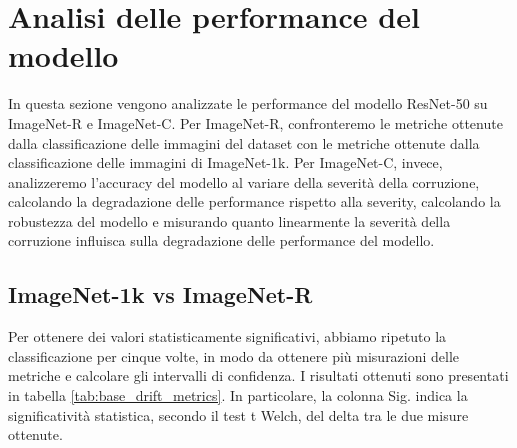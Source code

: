 \section{Analisi delle performance del modello}
In questa sezione vengono analizzate le performance del modello ResNet-50 su ImageNet-R e ImageNet-C. Per ImageNet-R, confronteremo le metriche ottenute dalla classificazione delle immagini del dataset con le metriche ottenute dalla classificazione delle immagini di ImageNet-1k. Per ImageNet-C, invece, analizzeremo l'accuracy del modello al variare della severità della corruzione, calcolando la degradazione delle performance rispetto alla severity, calcolando la robustezza del modello e misurando quanto linearmente la severità della corruzione influisca sulla degradazione delle performance del modello.
\subsection{ImageNet-1k vs ImageNet-R}
Per ottenere dei valori statisticamente significativi, abbiamo ripetuto la classificazione per cinque volte, in modo da ottenere più misurazioni delle metriche e calcolare gli intervalli di confidenza. I risultati ottenuti sono presentati in tabella \ref{tab:base_drift_metrics}. In particolare, la colonna Sig. indica la significatività statistica, secondo il test t Welch, del delta tra le due misure ottenute.
